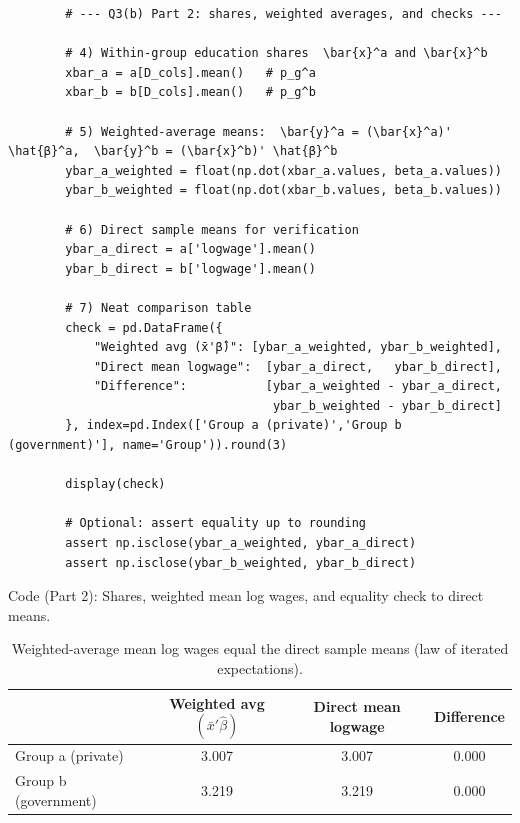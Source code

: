 \documentclass[12pt]{article}
\numberwithin{equation}{section}
\begin{document}
\begin{enumerate}[leftmargin=2em]
\begin{enumerate}[label=(\alph*),leftmargin=1.6em]
        \begin{listing}[H]
        \begin{verbatim}
        # --- Q3(b) Part 2: shares, weighted averages, and checks ---
        
        # 4) Within-group education shares  \bar{x}^a and \bar{x}^b
        xbar_a = a[D_cols].mean()   # p_g^a
        xbar_b = b[D_cols].mean()   # p_g^b
        
        # 5) Weighted-average means:  \bar{y}^a = (\bar{x}^a)' \hat{β}^a,  \bar{y}^b = (\bar{x}^b)' \hat{β}^b
        ybar_a_weighted = float(np.dot(xbar_a.values, beta_a.values))
        ybar_b_weighted = float(np.dot(xbar_b.values, beta_b.values))
        
        # 6) Direct sample means for verification
        ybar_a_direct = a['logwage'].mean()
        ybar_b_direct = b['logwage'].mean()
        
        # 7) Neat comparison table
        check = pd.DataFrame({
            "Weighted avg (x̄'β̂)": [ybar_a_weighted, ybar_b_weighted],
            "Direct mean logwage":  [ybar_a_direct,   ybar_b_direct],
            "Difference":           [ybar_a_weighted - ybar_a_direct,
                                     ybar_b_weighted - ybar_b_direct]
        }, index=pd.Index(['Group a (private)','Group b (government)'], name='Group')).round(3)
        
        display(check)
        
        # Optional: assert equality up to rounding
        assert np.isclose(ybar_a_weighted, ybar_a_direct)
        assert np.isclose(ybar_b_weighted, ybar_b_direct)
        \end{verbatim}
        \caption{Code (Part 2): Shares, weighted mean log wages, and equality check to direct means.}
        \end{listing}
        
        \begin{table}[H]
        \centering
        \caption{Weighted-average mean log wages equal the direct sample means (law of iterated expectations).}
        \begin{tabular}{l S S S}
        \toprule
        & {Weighted avg $(\bar x' \hat\beta)$} & {Direct mean logwage} & {Difference}\\
        \midrule
        Group a (private)     & 3.007 & 3.007 & 0.000 \\
        Group b (government)  & 3.219 & 3.219 & 0.000 \\
        \bottomrule
        \end{tabular}
        \label{tab:q3b-weighted-vs-direct}
        \end{table}


\end{enumerate}
\end{enumerate}
\end{document}
